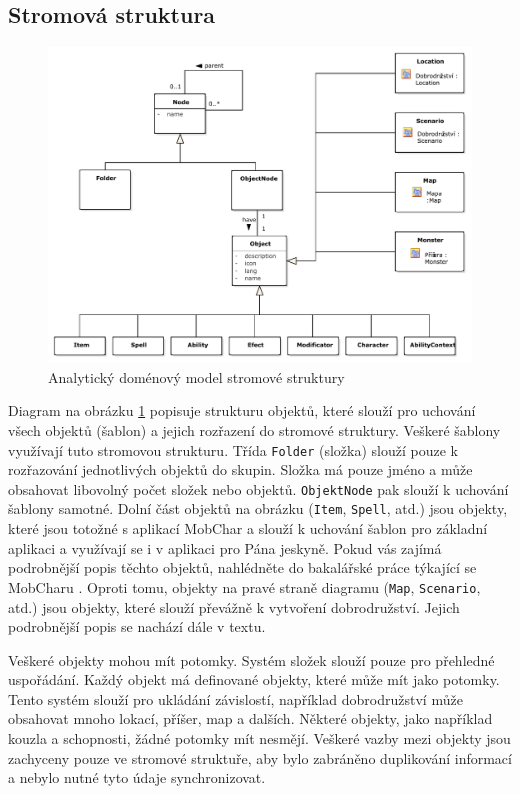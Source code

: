 \documentclass[thesis=B,czech]{resources/FITthesis}[2012/06/26]
\begin{document}
\subsection{Stromová struktura}
\begin{figure}\centering
	\includegraphics[width=1\textwidth]{images/domain_struktura}
	\caption[Analytický doménový model stromové struktury]{Analytický doménový model stromové struktury}\label{fig:dm_stromova_struktura}
\end{figure}
Diagram na obrázku \ref{fig:dm_stromova_struktura} popisuje strukturu objektů, které slouží pro uchování všech objektů (šablon) a jejich rozřazení do stromové struktury. Veškeré šablony využívají tuto stromovou strukturu. Třída \texttt{Folder} (složka) slouží pouze k rozřazování jednotlivých objektů do skupin. Složka má pouze jméno a může obsahovat libovolný počet složek nebo objektů. \texttt{ObjektNode} pak slouží k uchování šablony samotné. Dolní část objektů na obrázku (\texttt{Item}, \texttt{Spell}, atd.) jsou objekty, které jsou totožné s aplikací MobChar a slouží k uchování šablon pro základní aplikaci a využívají se i v aplikaci pro Pána jeskyně. Pokud vás zajímá podrobnější popis těchto objektů, nahlédněte do bakalářské práce týkající se MobCharu \cite{Weberova_2017}. Oproti tomu, objekty na pravé straně diagramu (\texttt{Map}, \texttt{Scenario}, atd.) jsou objekty, které slouží převážně k vytvoření dobrodružství. Jejich podrobnější popis se nachází dále v textu.\par

Veškeré objekty mohou mít potomky. Systém složek slouží pouze pro přehledné uspořádání. Každý objekt má definované objekty, které může mít jako potomky. Tento systém slouží pro ukládání závislostí, například dobrodružství může obsahovat mnoho lokací, příšer, map a dalších. Některé objekty, jako například kouzla a schopnosti, žádné potomky mít nesmějí. Veškeré vazby mezi objekty jsou zachyceny pouze ve stromové struktuře, aby bylo zabráněno duplikování informací a nebylo nutné tyto údaje synchronizovat.
\end{document}
